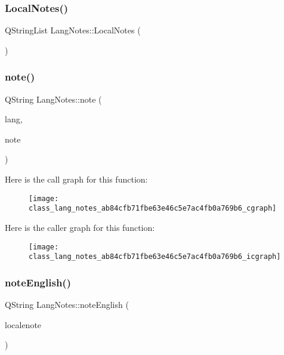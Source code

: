 \mbox{\label{class_lang_notes_a28ddc47fbf06cdf5d5336ec93a858df9}} 
\subsubsection{Local\+Notes()}
{\footnotesize\ttfamily Q\+String\+List Lang\+Notes\+::\+Local\+Notes (\begin{DoxyParamCaption}{ }\end{DoxyParamCaption})}

\mbox{\label{class_lang_notes_ab84cfb71fbe63e46c5e7ac4fb0a769b6}} 
\subsubsection{note()}
{\footnotesize\ttfamily Q\+String Lang\+Notes\+::note (\begin{DoxyParamCaption}\item[{Q\+String}]{lang,  }\item[{Q\+String}]{note }\end{DoxyParamCaption})}

Here is the call graph for this function\+:\nopagebreak
\begin{figure}[H]
\begin{center}
\leavevmode
\texttt{[image: class\_lang\_notes\_ab84cfb71fbe63e46c5e7ac4fb0a769b6\_cgraph]}
\end{center}
\end{figure}
Here is the caller graph for this function\+:\nopagebreak
\begin{figure}[H]
\begin{center}
\leavevmode
\texttt{[image: class\_lang\_notes\_ab84cfb71fbe63e46c5e7ac4fb0a769b6\_icgraph]}
\end{center}
\end{figure}
\mbox{\label{class_lang_notes_a2ba46ce9b8382afea3201b87cf1709ed}} 
\subsubsection{note\+English()}
{\footnotesize\ttfamily Q\+String Lang\+Notes\+::note\+English (\begin{DoxyParamCaption}\item[{Q\+String}]{localenote }\end{DoxyParamCaption})}

